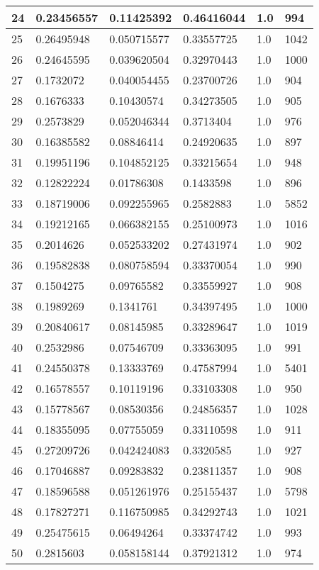 \begin{longtable}{|l|l|l|l|l|l|}
24 & 0.23456557 & 0.11425392 & 0.46416044 & 1.0 & 994 \\ \hline 
25 & 0.26495948 & 0.050715577 & 0.33557725 & 1.0 & 1042 \\ \hline 
26 & 0.24645595 & 0.039620504 & 0.32970443 & 1.0 & 1000 \\ \hline 
27 & 0.1732072 & 0.040054455 & 0.23700726 & 1.0 & 904 \\ \hline 
28 & 0.1676333 & 0.10430574 & 0.34273505 & 1.0 & 905 \\ \hline 
29 & 0.2573829 & 0.052046344 & 0.3713404 & 1.0 & 976 \\ \hline 
30 & 0.16385582 & 0.08846414 & 0.24920635 & 1.0 & 897 \\ \hline 
31 & 0.19951196 & 0.104852125 & 0.33215654 & 1.0 & 948 \\ \hline 
32 & 0.12822224 & 0.01786308 & 0.1433598 & 1.0 & 896 \\ \hline 
33 & 0.18719006 & 0.092255965 & 0.2582883 & 1.0 & 5852 \\ \hline 
34 & 0.19212165 & 0.066382155 & 0.25100973 & 1.0 & 1016 \\ \hline 
35 & 0.2014626 & 0.052533202 & 0.27431974 & 1.0 & 902 \\ \hline 
36 & 0.19582838 & 0.080758594 & 0.33370054 & 1.0 & 990 \\ \hline 
37 & 0.1504275 & 0.09765582 & 0.33559927 & 1.0 & 908 \\ \hline 
38 & 0.1989269 & 0.1341761 & 0.34397495 & 1.0 & 1000 \\ \hline 
39 & 0.20840617 & 0.08145985 & 0.33289647 & 1.0 & 1019 \\ \hline 
40 & 0.2532986 & 0.07546709 & 0.33363095 & 1.0 & 991 \\ \hline 
41 & 0.24550378 & 0.13333769 & 0.47587994 & 1.0 & 5401 \\ \hline 
42 & 0.16578557 & 0.10119196 & 0.33103308 & 1.0 & 950 \\ \hline 
43 & 0.15778567 & 0.08530356 & 0.24856357 & 1.0 & 1028 \\ \hline 
44 & 0.18355095 & 0.07755059 & 0.33110598 & 1.0 & 911 \\ \hline 
45 & 0.27209726 & 0.042424083 & 0.3320585 & 1.0 & 927 \\ \hline 
46 & 0.17046887 & 0.09283832 & 0.23811357 & 1.0 & 908 \\ \hline 
47 & 0.18596588 & 0.051261976 & 0.25155437 & 1.0 & 5798 \\ \hline 
48 & 0.17827271 & 0.116750985 & 0.34292743 & 1.0 & 1021 \\ \hline 
49 & 0.25475615 & 0.06494264 & 0.33374742 & 1.0 & 993 \\ \hline 
50 & 0.2815603 & 0.058158144 & 0.37921312 & 1.0 & 974 \\ \hline 
\end{longtable}